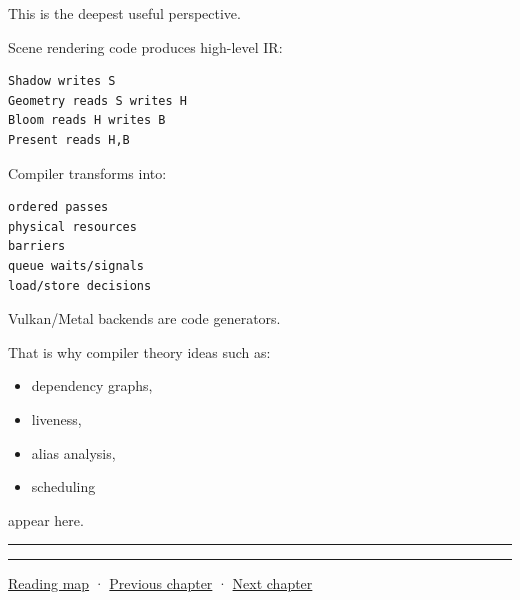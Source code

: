 This is the deepest useful perspective.

Scene rendering code produces high-level IR:

\begin{verbatim}
Shadow writes S
Geometry reads S writes H
Bloom reads H writes B
Present reads H,B
\end{verbatim}

Compiler transforms into:

\begin{verbatim}
ordered passes
physical resources
barriers
queue waits/signals
load/store decisions
\end{verbatim}

Vulkan/Metal backends are code generators.

That is why compiler theory ideas such as:

\begin{itemize}
\tightlist
\item
  dependency graphs,
\item
  liveness,
\item
  alias analysis,
\item
  scheduling
\end{itemize}

appear here.

\begin{center}\rule{0.5\linewidth}{0.5pt}\end{center}

\begin{center}\rule{0.5\linewidth}{0.5pt}\end{center}

\href{Chapter\%20Edition/03\%20-\%20Game\%20Engine/00\%20-\%20Reading\%20Map}{Reading map} · \hyperref[06-engine-ii-ch042]{Previous chapter} · \hyperref[06-engine-ii-ch044]{Next chapter}
